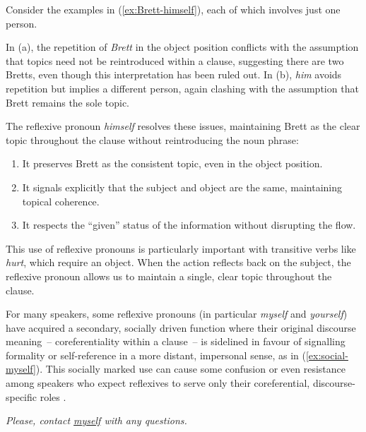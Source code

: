 Consider the examples in (\ref{ex:Brett-himself}), each of which involves just one person.

\ea\label{ex:Brett-himself}
\z
\z

In (a), the repetition of \textit{Brett} in the object position conflicts with the assumption that topics need not be reintroduced within a clause, suggesting there are two Bretts, even though this interpretation has been ruled out. In (b), \textit{him} avoids repetition but implies a different person, again clashing with the assumption that Brett remains the sole topic.

The reflexive pronoun \textit{himself} resolves these issues, maintaining Brett as the clear topic throughout the clause without reintroducing the noun phrase:

\begin{enumerate}[noitemsep]
    \item It preserves Brett as the consistent topic, even in the object position.
    \item It signals explicitly that the subject and object are the same, maintaining topical coherence.
    \item It respects the ``given'' status of the information without disrupting the flow.
\end{enumerate}

This use of reflexive pronouns is particularly important with transitive verbs like \textit{hurt}, which require an object. When the action reflects back on the subject, the reflexive pronoun allows us to maintain a single, clear topic throughout the clause.

For many speakers, some reflexive pronouns (in particular \textit{myself} and \textit{yourself}) have acquired a secondary, socially driven function where their original discourse meaning~-- coreferentiality within a clause~-- is sidelined in favour of signalling formality or self-reference in a more distant, impersonal sense, as in (\ref{ex:social-myself}). This socially marked use can cause some confusion or even resistance among speakers who expect reflexives to serve only their coreferential, discourse-specific roles \citep{Gilman1989}.

\ea\textit{Please, contact \uline{myself} with any questions.}\label{ex:social-myself}
\z

